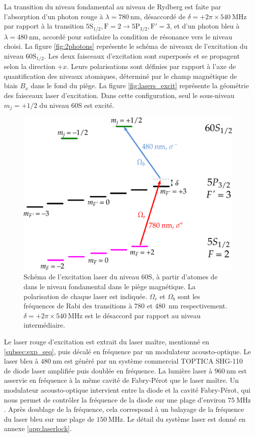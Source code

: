 La transition du niveau fondamental au niveau de Rydberg est faite par l'absorption d'un photon rouge à $\lambda = \SI{780}{\nano\meter}$, désaccordé de $\delta=+2\pi\times\SI{540}{\MHz}$ par rapport à la transition $\mathrm{5S_{1/2},F=2 \rightarrow 5P_{3/2},F'=3}$, et d'un photon bleu à $\lambda = \SI{480}{\nano\meter}$, accordé pour satisfaire la condition de résonance vers le niveau choisi.
La figure \eqref{fig:2photons} représente le schéma de niveaux de l'excitation du niveau $\mathrm{60S_{1/2}}$.
Les deux faisceaux d'excitation sont superposés et se propagent selon la direction $+x$. Leurs polarisations sont définies par rapport à l'axe de quantification des niveaux atomiques, déterminé par le champ magnétique de biais $B_x$ dans le fond du piège.
La figure \eqref{fig:lasers_excit} représente la géométrie des faisceaux laser d'excitation.
Dans cette configuration, seul le sous-niveau $m_j=+1/2$ du niveau 60S est excité.
%
\begin{figure}[!h]
\centering
\includegraphics[width=.7\linewidth]{figures/setup/rydberg/2photons}
\caption[Excitation du niveau 60S]{Schéma de l'excitation laser du niveau 60S, à partir d'atomes de  dans le niveau fondamental dans le piège magnétique.
La polarisation de chaque laser est indiquée.
$\Omega_r$ et $\Omega_b$ sont les fréquences de Rabi des transitions à \num{780} et \SI{480}{\nano\meter} respectivement.
$\delta=+2\pi\times\SI{540}{\MHz}$ est le désaccord par rapport au niveau intermédiaire.
}
\label{fig:2photons}
\end{figure}

Le laser rouge d'excitation est extrait du laser maître, mentionné en \ref{subsec:exp_seq}, puis décalé en fréquence par un modulateur acousto-optique.
Le laser bleu à $\SI{480}{\nm}$ est généré par un système commercial TOPTICA SHG-110 de diode laser amplifiée puis doublée en fréquence.
La lumière laser à $\SI{960}{\nm}$ est asservie en fréquence à la même cavité de Fabry-Pérot que le laser maître.
Un modulateur acousto-optique intervient entre la diode et la cavité Fabry-Pérot, qui nous permet de contrôler la fréquence de la diode sur une plage d'environ $\SI{75}{\MHz}$.
Après doublage de la fréquence, cela correspond à un balayage de la fréquence du laser bleu sur une plage de $\SI{150}{\MHz}$.
Le détail du système laser est donné en annexe \ref{app:laserlock}.

